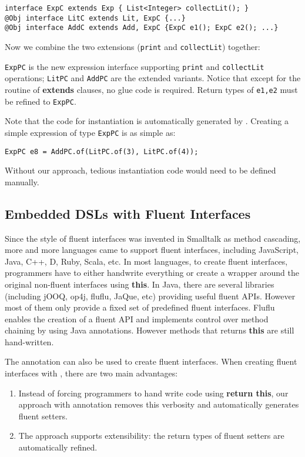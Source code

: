 \begin{lstlisting}[]
interface ExpC extends Exp { List<Integer> collectLit(); }
@Obj interface LitC extends Lit, ExpC {...}
@Obj interface AddC extends Add, ExpC {ExpC e1(); ExpC e2(); ...}
\end{lstlisting}

\noindent Now we combine the two extensions (\texttt{print} and
\texttt{collectLit}) together:



\noindent \texttt{ExpPC} is the new expression interface supporting
\texttt{print} and \texttt{collectLit} operations; \texttt{LitPC} and
\texttt{AddPC} are the extended variants. Notice that except for the routine of
\textbf{extends} clauses, no glue code is required. Return types of
\texttt{e1,e2} must be refined to \texttt{ExpPC}.

Note that the code for instantiation is automatically generated by \mixin. 
Creating a simple expression of type \texttt{ExpPC} is 
as simple as:
\begin{lstlisting}
ExpPC e8 = AddPC.of(LitPC.of(3), LitPC.of(4));
\end{lstlisting}
\noindent Without our approach, tedious instantiation code would need 
to be defined manually. 

\subsection{Embedded DSLs with Fluent Interfaces}\label{sec:dsls}
Since the style of fluent interfaces was invented in Smalltalk as method
cascading, more and more languages came to support fluent interfaces, including
JavaScript, Java, C++, D, Ruby, Scala, etc. In most languages, to create fluent
interfaces, programmers have to either handwrite everything or create a wrapper
around the original non-fluent interfaces using \textbf{this}. In Java, there
are several libraries (including jOOQ, op4j, fluflu, JaQue, etc) providing useful
fluent APIs. However most of them only provide a fixed set of predefined fluent
interfaces. Fluflu enables the creation of a fluent API and implements control
over method chaining by using Java annotations. However methods that returns
\textbf{this} are still hand-written.

The \mixin annotation can also be used to create fluent interfaces.  When
creating fluent interfaces with \mixin, there are two main advantages:
\begin{enumerate}
\item Instead of forcing programmers to hand write code using \textbf{return
    this}, our approach with \mixin annotation removes this verbosity and
  automatically generates fluent setters.
\item The approach supports extensibility: the return types of fluent setters are
  automatically refined.
\end{enumerate} 

